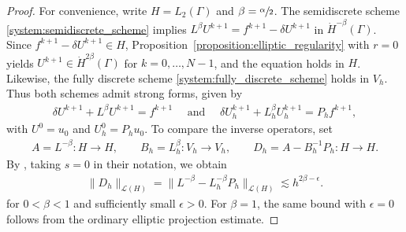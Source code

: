 \documentclass[numbers,webpdf]{ima-authoring-template}%
\theoremstyle{thmstyletwo}%
\numberwithin{equation}{section}
\begin{document}
\begin{proof}  
    For convenience, write $H=L_2(\Gamma)$ and $\beta=\sfrac{\alpha}{2}$. The semidiscrete scheme \eqref{system:semidiscrete_scheme} implies $L^\beta U^{k+1}=f^{k+1}- \delta U^{k+1}$ in $\dot H^{-\beta}(\Gamma)$. Since $f^{k+1}- \delta U^{k+1}\in H$, Proposition~\ref{proposition:elliptic_regularity} with $r=0$ yields $U^{k+1}\in\dot H^{2\beta}(\Gamma)$ for $k = 0,\dots,N-1$, and the equation holds in $H$. Likewise, the fully discrete scheme \eqref{system:fully_discrete_scheme} holds in $V_h$. Thus both schemes admit strong forms, given by
    \begin{align}
    \label{eq:alternative_strong_schemes}
    \delta U^{k+1}+L^\beta U^{k+1}=f^{k+1}\quad\text{ and }\quad
    \delta U_h^{k+1}+L_h^\beta U_h^{k+1}=P_hf^{k+1},
    \end{align}
    with $U^0=u_0$ and $U_h^0=P_hu_0$. To compare the inverse operators, set
    \begin{align*}
        A=L^{-\beta}:H\to H, \qquad B_h=L_h^\beta:V_h\to V_h, \qquad D_h=A-B_h^{-1}P_h:H\to H.
    \end{align*}
    By \cite[Lemma~6.4(a)]{bolin2023regularity}, taking $s=0$ in their notation, we obtain
    \begin{align}
    \label{eq:alternative_inverse_bound}
    \|D_h\|_{\mathcal L(H)}
    =\|L^{-\beta}-L_h^{-\beta}P_h\|_{\mathcal L(H)}
    \lesssim h^{2\beta-\epsilon}.
    \end{align}
    for $0<\beta<1$ and sufficiently small $\epsilon>0$. For $\beta=1$, the same bound with $\epsilon=0$ follows from the ordinary elliptic projection estimate.
    

\end{proof}
\end{document}
